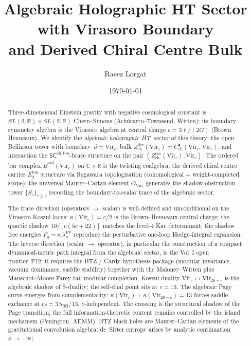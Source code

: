 \documentclass[11pt,reqno]{amsart}
\theoremstyle{definition}
\theoremstyle{remark}
\providecommand{\Vir}{\mathrm{Vir}}
\providecommand{\barB}{\bar{B}}
\begin{document}
\title[Algebraic Holographic HT Sector for 3d Gravity]
{Algebraic Holographic HT Sector with Virasoro Boundary\\
 and Derived Chiral Centre Bulk}

\author{Raeez Lorgat}
\address{Perimeter Institute for Theoretical Physics,
 Waterloo, ON N2L 2Y5, Canada}

\date{\today}

\begin{abstract}
Three-dimensional Einstein gravity with negative cosmological
constant is $SL(2,\mathbb{R}) \times SL(2,\mathbb{R})$ Chern--Simons
(Ach\'ucarro--Townsend, Witten); its boundary symmetry algebra is
the Virasoro algebra at central charge $c = 3\ell/(2G)$
(Brown--Henneaux). We identify the \emph{algebraic holographic
HT~sector} of this theory: the open Beilinson tower with
boundary~$\partial = \Vir_c$, bulk
$Z^{\mathrm{der}}_{\mathrm{ch}}(\Vir_c)
=C^\bullet_{\mathrm{ch}}(\Vir_c,\Vir_c)$,
and interaction the $\mathsf{SC}^{\mathrm{ch,top}}$-brace structure
on the pair $(Z^{\mathrm{der}}_{\mathrm{ch}}(\Vir_c), \Vir_c)$. The
ordered bar complex $\barB^{\mathrm{ord}}(\Vir_c)$ on
$\mathbb{C} \times \mathbb{R}$ is the twisting coalgebra; the
derived chiral centre carries $E_3^{\mathrm{top}}$ structure via
Sugawara topologisation (cohomological + weight-completed scope);
the universal Maurer--Cartan element $\Theta_{\Vir_c}$ generates the
shadow obstruction tower $\{S_r\}_{r \ge 2}$ recording the
boundary-to-scalar trace of the algebraic sector.

The trace direction (operators $\to$ scalar) is well-defined and
unconditional on the Virasoro Koszul locus: $\kappa(\Vir_c) = c/2$
is the Brown--Henneaux central charge; the quartic shadow
$10/[c(5c{+}22)]$ matches the level-$4$ Kac determinant; the
shadow free energies $F_g = \kappa\,\lambda_g^{\mathrm{FP}}$
reproduce the perturbative one-loop Hodge-integral expansion. The
inverse direction (scalar $\to$ operator), in particular the
construction of a compact dynamical-metric path integral from the
algebraic sector, is the Vol~I open frontier~F12: it requires the
BTZ / Cardy hypothesis package (modular invariance, vacuum
dominance, saddle stability) together with the Maloney--Witten
plus Manschot--Moore Farey-tail modular completion. Koszul duality
$\Vir_c \leftrightarrow \Vir_{26-c}$ is the algebraic shadow of
S-duality; the self-dual point sits at $c = 13$. The algebraic Page
curve emerges from complementarity:
$\kappa(\Vir_c) + \kappa(\Vir_{26-c}) = 13$ forces saddle exchange
at $t_P = 3S_{\mathrm{BH}}/13$, $c$-independent. The crossing is the
structural shadow of the Page transition; the full
information-theoretic content remains controlled by the island
mechanism (Penington, AEMM). BTZ black holes are Maurer--Cartan
elements of the gravitational convolution algebra; de~Sitter entropy
arises by analytic continuation $\kappa \to -|\kappa|$.
\end{abstract}
\end{document}
